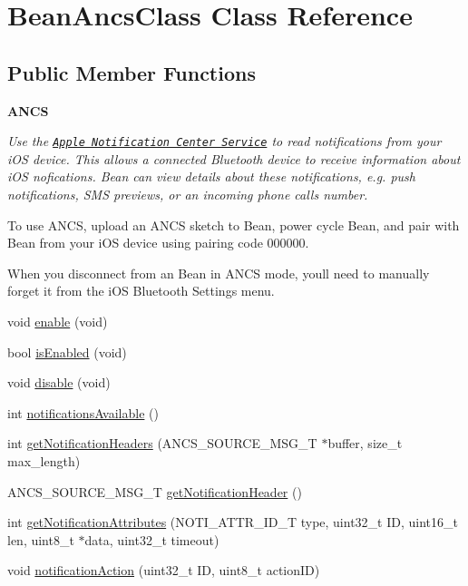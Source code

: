 \hypertarget{class_bean_ancs_class}{}\section{Bean\+Ancs\+Class Class Reference}
\label{class_bean_ancs_class}
\subsection*{Public Member Functions}
\begin{Indent}{\bf A\+N\+C\+S}\par
{\em Use the \href{https://developer.apple.com/library/ios/documentation/CoreBluetooth/Reference/AppleNotificationCenterServiceSpecification/Introduction/Introduction.html}{\tt Apple Notification Center Service} to read notifications from your i\+O\+S device. This allows a connected Bluetooth device to receive information about i\+O\+S nofications. Bean can view details about these notifications, e.\+g. push notifications, S\+M\+S previews, or an incoming phone call\textquotesingle{}s number.

To use A\+N\+C\+S, upload an A\+N\+C\+S sketch to Bean, power cycle Bean, and pair with Bean from your i\+O\+S device using pairing code 000000.

When you disconnect from an Bean in A\+N\+C\+S mode, you\textquotesingle{}ll need to manually forget it from the i\+O\+S Bluetooth Settings menu. }\begin{DoxyCompactItemize}
\item 
void \hyperlink{class_bean_ancs_class_aa3d157f0b796947032a27e6185be895a}{enable} (void)
\item 
bool \hyperlink{class_bean_ancs_class_a13833644884b8cc61e8d70ac850a500c}{is\+Enabled} (void)
\item 
void \hyperlink{class_bean_ancs_class_a5eff3ac01fb4248dace32c7a18d9d68e}{disable} (void)
\item 
int \hyperlink{class_bean_ancs_class_a29b6dc1d900b8c1dc93f40beaf29c8d9}{notifications\+Available} ()
\item 
int \hyperlink{class_bean_ancs_class_affaf3691b746468f5e11f78c9b74a755}{get\+Notification\+Headers} (A\+N\+C\+S\+\_\+\+S\+O\+U\+R\+C\+E\+\_\+\+M\+S\+G\+\_\+\+T $\ast$buffer, size\+\_\+t max\+\_\+length)
\item 
A\+N\+C\+S\+\_\+\+S\+O\+U\+R\+C\+E\+\_\+\+M\+S\+G\+\_\+\+T \hyperlink{class_bean_ancs_class_a8acff1decc559bc697e2757f5ebc12ee}{get\+Notification\+Header} ()
\item 
int \hyperlink{class_bean_ancs_class_ae0dc33b6e27d0ed37a345462ad58ba01}{get\+Notification\+Attributes} (N\+O\+T\+I\+\_\+\+A\+T\+T\+R\+\_\+\+I\+D\+\_\+\+T type, uint32\+\_\+t I\+D, uint16\+\_\+t len, uint8\+\_\+t $\ast$data, uint32\+\_\+t timeout)
\item 
void \hyperlink{class_bean_ancs_class_aa9ac67079e02d7fffc198d27854226c0}{notification\+Action} (uint32\+\_\+t I\+D, uint8\+\_\+t action\+I\+D)
\end{DoxyCompactItemize}
\end{Indent}


